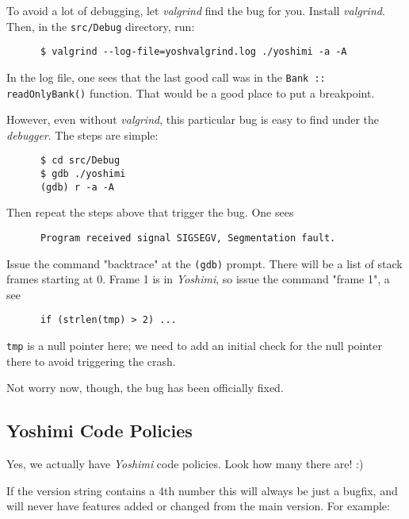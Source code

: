    To avoid a lot of debugging, let \textsl{valgrind} find the bug for you.
   Install \textsl{valgrind}.  Then, in the \texttt{src/Debug} directory,
   run:

   \begin{verbatim}
      $ valgrind --log-file=yoshvalgrind.log ./yoshimi -a -A
   \end{verbatim}

   In the log file, one sees that the last good call was in the
   \texttt{Bank :: readOnlyBank()} function.  That would be a good place to
   put a breakpoint.

   However, even without \textsl{valgrind}, this particular bug is easy to
   find under the \textsl{debugger}.  The steps are simple:

   \begin{verbatim}
      $ cd src/Debug
      $ gdb ./yoshimi
      (gdb) r -a -A
   \end{verbatim}

   Then repeat the steps above that trigger the bug.
   One sees

   \begin{verbatim}
      Program received signal SIGSEGV, Segmentation fault.
   \end{verbatim}

   Issue the command "backtrace" at the \texttt{(gdb)} prompt.  There will
   be a list of stack frames starting at 0.  Frame 1 is in \textsl{Yoshimi},
   so issue the command "frame 1", a see

   \begin{verbatim}
      if (strlen(tmp) > 2) ...
   \end{verbatim}

   \texttt{tmp} is a null pointer here; we need to add an initial check for
   the null pointer there to avoid triggering the crash.

   Not worry now, though, the bug has been officially fixed.

\subsection{Yoshimi Code Policies}
\label{subsec:yoshimi_code_policies}

   Yes, we actually have \textsl{Yoshimi} code policies.
   Look how many there are! :)

   If the version string contains a 4th number this will always be just a
   bugfix, and will never have features added or changed from the main version.
   For example:

